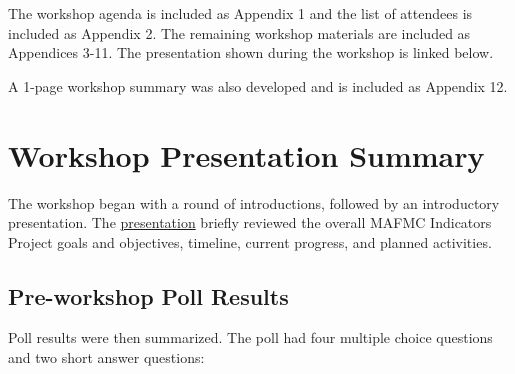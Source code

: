 \documentclass[
]{article}
\begin{document}
The workshop agenda is included as Appendix 1 and the list of attendees is included as Appendix 2. The remaining workshop materials are included as Appendices 3-11. The presentation shown during the workshop is linked below.

A 1-page workshop summary was also developed and is included as Appendix 12.

\section{Workshop Presentation Summary}\label{workshop-presentation-summary}

The workshop began with a round of introductions, followed by an introductory presentation. The \href{https://sgaichas.github.io/HSpresentations/20260331_ProjectOverview_MiniWK_Gaichas.html}{presentation} briefly reviewed the overall MAFMC Indicators Project goals and objectives, timeline, current progress, and planned activities.

\subsection{Pre-workshop Poll Results}\label{pre-workshop-poll-results}

Poll results were then summarized. The poll had four multiple choice questions and two short answer questions:
\end{document}
